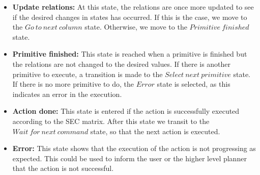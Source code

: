\begin{itemize}
 \item \textbf{Update relations:} At this state, the relations are once more updated to see if the desired changes in states has occurred.
 If this is the case, we move to the $Go\ to\ next\ column$ state.
 Otherwise, we move to the $Primitive\ finished$ state.
 \item \textbf{Primitive finished:} This state is reached when a primitive is finished but the relations are not changed to the desired values.
 If there is another primitive to execute, a transition is made to the $Select\ next\ primitive$ state.
 If there is no more primitive to do, the $Error$ state is selected, as this indicates an error in the execution.
 \item \textbf{Action done:} This state is entered if the action is successfully executed according to the SEC matrix.
 After this state we transit to the $Wait\ for\ next\ command$ state, so that the next action is executed.
 \item \textbf{Error:} This state shows that the execution of the action is not progressing as expected.
 This could be used to inform the user or the higher level planner that the action is not successful.
\end{itemize}




